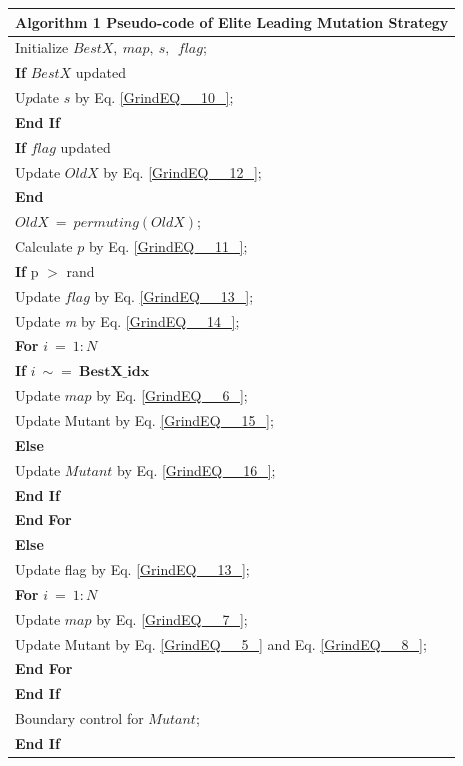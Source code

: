 \documentclass{article} %
\begin{document}
\begin{tabular}{|p{3.9in}|} \hline 
\textbf{Algorithm }1 Pseudo-code of Elite Leading Mutation Strategy \\ \hline 
Initialize $BestX,\ map,\ s,\ \ flag$; \\ \hline 
\textbf{If} $BestX$ updated \\ \hline 
    U$p$date $s$ by Eq. \eqref{GrindEQ__10_}; \\ \hline 
\textbf{End If} \\ \hline 
\textbf{If} $flag$ updated \\ \hline 
    Update $OldX$ by Eq. \eqref{GrindEQ__12_}; \\ \hline 
\textbf{End} \\ \hline 
$OldX\ =\ permuting(OldX)$; \\ \hline 
Calculate $p$ by Eq. \eqref{GrindEQ__11_}; \\ \hline 
\textbf{If} p $\mathrm{>}$ rand \\ \hline 
    Update $flag$ by Eq. \eqref{GrindEQ__13_}; \\ \hline 
    Update \textit{m} by Eq. \eqref{GrindEQ__14_}; \\ \hline 
    \textbf{For} $i\ =\ 1:N$ \\ \hline 
        \textbf{If} $i\ \sim =\ \boldsymbol{BestX}\boldsymbol{\_}\boldsymbol{idx}$ \\ \hline 
            Update $map$ by Eq. \eqref{GrindEQ__6_}; \\ \hline 
            Update Mutant by Eq. \eqref{GrindEQ__15_}; \\ \hline 
        \textbf{Else} \\ \hline 
            Update $Mutant$ by Eq. \eqref{GrindEQ__16_}; \\ \hline 
        \textbf{End If} \\ \hline 
    \textbf{End} \textbf{For} \\ \hline 
    \textbf{Else} \\ \hline 
\textbf{        }Update flag by Eq. \eqref{GrindEQ__13_}; \\ \hline 
\textbf{        For }$i\ =\ 1:N$ \\ \hline 
            Update $map$ by Eq. \eqref{GrindEQ__7_}; \\ \hline 
            Update Mutant by Eq. \eqref{GrindEQ__5_} and Eq. \eqref{GrindEQ__8_}; \\ \hline 
        \textbf{End For} \\ \hline 
    \textbf{End If} \\ \hline 
    Boundary control for $Mutant$; \\ \hline 
\textbf{End If} \\ \hline 
\end{tabular}
\end{document}
